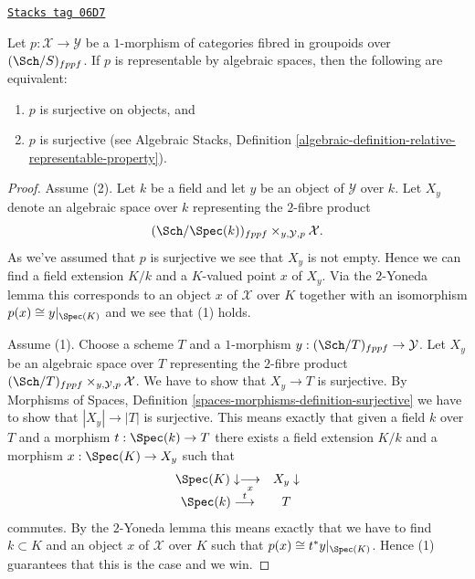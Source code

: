 \begin{lemma}
\label{criteria-lemma-representable-by-spaces-surjective}
\href{https://stacks.math.columbia.edu/tag/06D7}{\texttt{Stacks tag 06D7}}

Let $p : \mathcal{X} \to \mathcal{Y}$ be a $1$-morphism of categories
fibred in groupoids over $(\Sch/S)_{fppf}$. If $p$ is
representable by algebraic spaces, then the following are equivalent:
\begin{enumerate}
\item $p$ is surjective on objects, and
\item $p$ is surjective (see
Algebraic Stacks,
Definition \ref{algebraic-definition-relative-representable-property}).
\end{enumerate}
\end{lemma}

\begin{proof}
Assume (2). Let $k$ be a field and let $y$ be an object of
$\mathcal{Y}$ over $k$. Let $X_y$ denote an algebraic space over $k$
representing the $2$-fibre product
$$
(\Sch/\Spec(k))_{fppf} \times_{y, \mathcal{Y}, p} \mathcal{X}.
$$
As we've assumed that $p$ is surjective we see that $X_y$ is not empty.
Hence we can find a field extension $K/k$ and a $K$-valued point
$x$ of $X_y$. Via the $2$-Yoneda lemma this corresponds to an object
$x$ of $\mathcal{X}$ over $K$ together with an isomorphism
$p(x) \cong y|_{\Spec(K)}$ and we see that (1) holds.

\medskip\noindent
Assume (1). Choose a scheme $T$ and a $1$-morphism
$y : (\Sch/T)_{fppf} \to \mathcal{Y}$. Let
$X_y$ be an algebraic space over $T$ representing the $2$-fibre product
$(\Sch/T)_{fppf} \times_{y, \mathcal{Y}, p} \mathcal{X}$.
We have to show that $X_y \to T$ is surjective. By
Morphisms of Spaces, Definition \ref{spaces-morphisms-definition-surjective}
we have to show that $|X_y| \to |T|$ is surjective.
This means exactly that given a field $k$ over $T$ and a
morphism $t : \Spec(k) \to T$ there exists a field extension
$K/k$ and a morphism $x : \Spec(K) \to X_y$ such that
$$
\begin{array}{cc}\Spec(K) \downarrow\underset{x}{\longrightarrow} & X_y \downarrow \\ \Spec(k) \overset{t}{\longrightarrow} & T\end{array}
$$
commutes. By the $2$-Yoneda lemma this means exactly that we have to find
$k \subset K$ and an object $x$ of $\mathcal{X}$ over $K$ such that
$p(x) \cong t^*y|_{\Spec(K)}$. Hence (1) guarantees that this is
the case and we win.
\end{proof}

